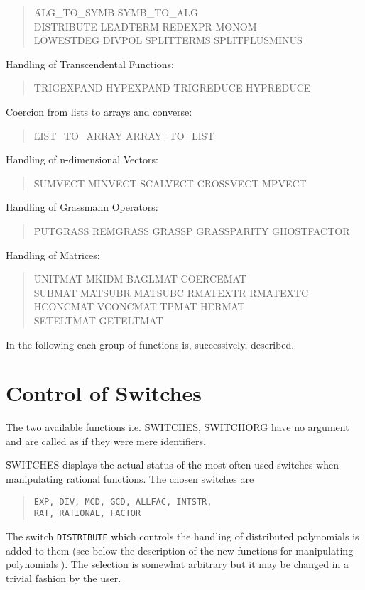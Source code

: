 \begin{itemize}
\begin{quotation}
\f{ALG\_TO\_SYMB SYMB\_TO\_ALG \\
DISTRIBUTE LEADTERM REDEXPR MONOM\\
LOWESTDEG DIVPOL SPLITTERMS SPLITPLUSMINUS}
\end{quotation}
\item{Handling of Transcendental Functions:}
\begin{quotation}
\noindent
\f{TRIGEXPAND HYPEXPAND TRIGREDUCE HYPREDUCE}
\end{quotation}
\item{Coercion from lists to arrays and converse:}
\begin{quotation}
\f{LIST\_TO\_ARRAY ARRAY\_TO\_LIST}
\end{quotation}
\item{Handling of n-dimensional Vectors:}
\begin{quotation}
\noindent
\f{SUMVECT MINVECT SCALVECT CROSSVECT MPVECT }
\end{quotation}
{\item Handling of Grassmann Operators:}
\begin{quotation}
\noindent
\f{PUTGRASS REMGRASS GRASSP GRASSPARITY GHOSTFACTOR }
\end{quotation}
\item{Handling of Matrices:}
\begin{quotation}
\noindent
\f{UNITMAT MKIDM BAGLMAT COERCEMAT \\
SUBMAT MATSUBR MATSUBC RMATEXTR RMATEXTC \\
 HCONCMAT VCONCMAT TPMAT HERMAT \\
SETELTMAT GETELTMAT}
\end{quotation}
\end{itemize}
In the following each group of functions is, successively, described.
\section{Control of Switches}
The two available functions i.e. \f{SWITCHES, SWITCHORG} have
no argument and are called as if they were mere identifiers.

\f{SWITCHES} displays the actual status of the most often used switches
when manipulating rational functions. The chosen switches are
\begin{quotation}
\noindent
{\tt EXP, DIV, MCD, GCD, ALLFAC, INTSTR,\\ RAT, RATIONAL, FACTOR }
\end{quotation}
The switch {\tt DISTRIBUTE} which controls the handling
of distributed polynomials is added to them (see below the description of
the new functions for manipulating polynomials ).
The selection is somewhat arbitrary but it may be changed in a trivial
fashion by the user.

